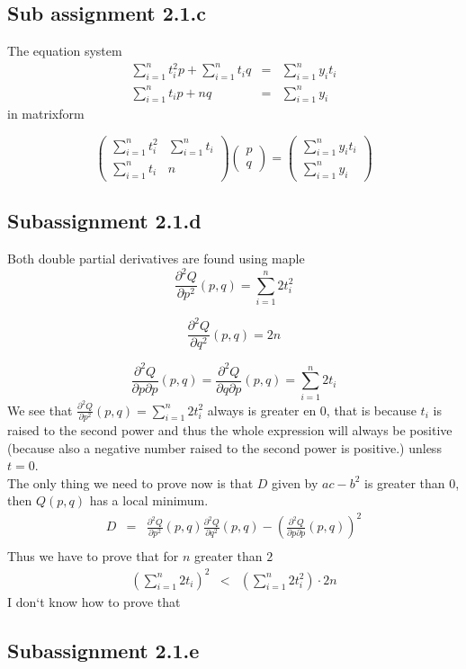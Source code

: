 \documentclass[english]{article}
\begin{document}
\subsection*{Sub assignment 2.1.c}
The equation system
\begin{equation}
\begin{array}{ccc}
	\sum\limits_{i=1}^n t_i^2 p +\sum\limits_{i=1}^n t_i q & = & \sum\limits_{i=1}^n y_i t_i \\
	\sum\limits_{i=1}^n t_i p + nq & = & \sum\limits_{i=1}^n y_i
\end{array}
\end{equation}
in matrixform

\begin{equation}
 \begin{pmatrix}
  \sum\limits_{i=1}^n t_i^2 & \sum\limits_{i=1}^n t_i \\
  \sum\limits_{i=1}^n t_i & n
 \end{pmatrix}
  \begin{pmatrix}
p \\ q
 \end{pmatrix}
 =
\begin{pmatrix}
 \sum\limits_{i=1}^n y_i t_i  \\ \sum\limits_{i=1}^n y_i
 \end{pmatrix}
\end{equation}

\subsection*{Subassignment 2.1.d}
Both double partial derivatives are found using maple
\begin{equation}
	\frac{\partial^2 Q}{\partial p^2}(p,q) = \sum \limits_{i=1}^n 2t_i^2
\end{equation}

\begin{equation}
	\frac{\partial^2 Q}{\partial q^2}(p,q)= 2n
\end{equation}

\begin{equation}
	\frac{\partial^2 Q}{\partial p \partial p}(p,q)= \frac{\partial^2 Q}{\partial q \partial p}(p,q)= \sum \limits_{i=1}^n 2t_i
\end{equation}
We see that  $\frac{\partial^2 Q}{\partial p^2}(p,q)  = \sum \limits_{i=1}^n 2t_i^2$ always is greater en $0$, that is because $t_i$ is raised to the second power and thus the whole expression will always be positive (because also a negative number raised to the second power is positive.) unless $t=0$. \\ The only thing we need to prove now is that  $D$ given by $ac-b^2$ is greater than $0$, then $Q(p,q)$ has a local minimum.
\begin{eqnarray}
D &=& \frac{\partial^2 Q}{\partial p^2}(p,q) \frac{\partial^2 Q}{\partial q^2}(p,q) - (\frac{\partial^2 Q}{\partial p \partial p}(p,q))^2 \\
 \end{eqnarray}
 Thus we have to prove that for $n$ greater than $2$
 \begin{eqnarray}
 (\sum \limits_{i=1}^n 2t_i)^2 &<&  (\sum \limits_{i=1}^n 2t_i^2) \cdot 2n
 \end{eqnarray}
 I don`t know how to prove that
 \subsection*{Subassignment 2.1.e}
\end{document}
